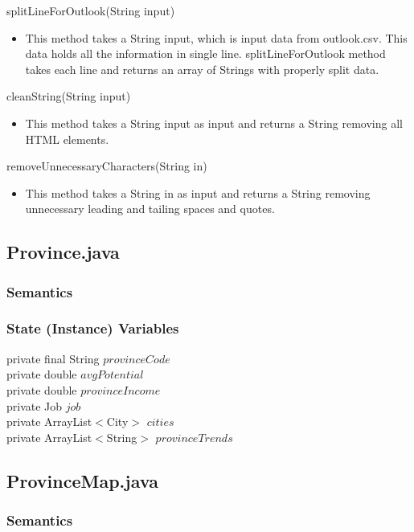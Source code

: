 \documentclass[12pt,fleqn]{article}
\begin{document}
\noindent splitLineForOutlook(String input)
\begin{itemize}
\item This method takes a String input, which is input data from outlook.csv. This data holds all the information in single line. splitLineForOutlook method takes each line and returns an array of Strings with properly split data.
\end{itemize}

\noindent cleanString(String input)
\begin{itemize}
\item This method takes a String input as input and returns a String removing all HTML elements.
\end{itemize}

\noindent removeUnnecessaryCharacters(String in)
\begin{itemize}
\item This method takes a String in as input and returns a String removing unnecessary leading and tailing spaces and quotes.
\end{itemize}


\subsection*{Province.java}\label{pprov}

\subsubsection*{Semantics}
\subsubsection*{State (Instance) Variables}
	private final String $provinceCode$\\
	private double $avgPotential$\\
	private double $provinceIncome$\\
	private Job $job$\\
	private ArrayList$<$City$>$ $cities$\\
	private ArrayList$<$String$>$ $provinceTrends$\\


\subsection*{ProvinceMap.java}\label{pprovmap}

\subsubsection*{Semantics}
\end{document}
